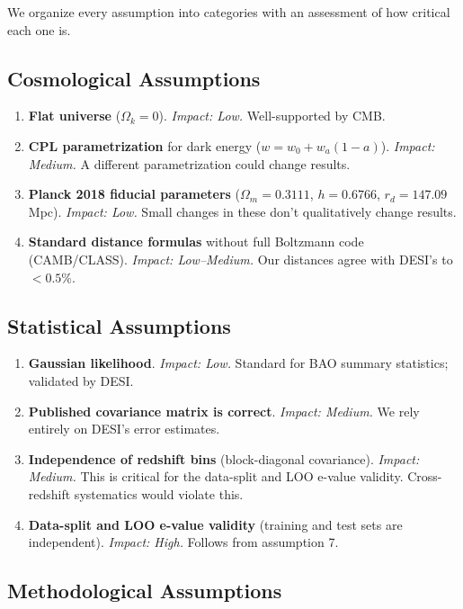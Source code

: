 \documentclass[11pt,a4paper]{article}
\begin{document}
We organize every assumption into categories with an assessment of how critical each one is.

\subsection{Cosmological Assumptions}

\begin{enumerate}
    \item \textbf{Flat universe} ($\Omega_k = 0$). \textit{Impact: Low.} Well-supported by CMB.
    \item \textbf{CPL parametrization} for dark energy ($w = w_0 + w_a(1-a)$). \textit{Impact: Medium.} A different parametrization could change results.
    \item \textbf{Planck 2018 fiducial parameters} ($\Omega_m = 0.3111$, $h = 0.6766$, $r_d = 147.09$ Mpc). \textit{Impact: Low.} Small changes in these don't qualitatively change results.
    \item \textbf{Standard distance formulas} without full Boltzmann code (CAMB/CLASS). \textit{Impact: Low--Medium.} Our distances agree with DESI's to $<0.5\%$.
\end{enumerate}

\subsection{Statistical Assumptions}

\begin{enumerate}[resume]
    \item \textbf{Gaussian likelihood}. \textit{Impact: Low.} Standard for BAO summary statistics; validated by DESI.
    \item \textbf{Published covariance matrix is correct}. \textit{Impact: Medium.} We rely entirely on DESI's error estimates.
    \item \textbf{Independence of redshift bins} (block-diagonal covariance). \textit{Impact: Medium.} This is critical for the data-split and LOO e-value validity. Cross-redshift systematics would violate this.
    \item \textbf{Data-split and LOO e-value validity} (training and test sets are independent). \textit{Impact: High.} Follows from assumption 7.
\end{enumerate}

\subsection{Methodological Assumptions}
\end{document}
